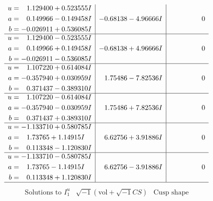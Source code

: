 \documentclass[1p]{elsarticle_modified}
\theoremstyle{definition}
\newcommand{\I}{\sqrt{-1}}
\begin{document}
$$\begin{array}{c|c|c}
\begin{aligned}
u &= \phantom{-}1.129400 + 0.523555 I \\
a &= \phantom{-}0.149966 - 0.149458 I \\
b &= -0.026911 + 0.536085 I\end{aligned}
 & -0.68138 - 4.96666 I & \phantom{-0.000000 } 0 \\ \hline\begin{aligned}
u &= \phantom{-}1.129400 - 0.523555 I \\
a &= \phantom{-}0.149966 + 0.149458 I \\
b &= -0.026911 - 0.536085 I\end{aligned}
 & -0.68138 + 4.96666 I & \phantom{-0.000000 } 0 \\ \hline\begin{aligned}
u &= \phantom{-}1.107220 + 0.614084 I \\
a &= -0.357940 + 0.030959 I \\
b &= \phantom{-}0.371437 - 0.389310 I\end{aligned}
 & \phantom{-}1.75486 - 7.82536 I & \phantom{-0.000000 } 0 \\ \hline\begin{aligned}
u &= \phantom{-}1.107220 - 0.614084 I \\
a &= -0.357940 - 0.030959 I \\
b &= \phantom{-}0.371437 + 0.389310 I\end{aligned}
 & \phantom{-}1.75486 + 7.82536 I & \phantom{-0.000000 } 0 \\ \hline\begin{aligned}
u &= -1.133710 + 0.580785 I \\
a &= \phantom{-}1.73765 + 1.14915 I \\
b &= \phantom{-}0.113348 - 1.120830 I\end{aligned}
 & \phantom{-}6.62756 + 3.91886 I & \phantom{-0.000000 } 0 \\ \hline\begin{aligned}
u &= -1.133710 - 0.580785 I \\
a &= \phantom{-}1.73765 - 1.14915 I \\
b &= \phantom{-}0.113348 + 1.120830 I\end{aligned}
 & \phantom{-}6.62756 - 3.91886 I & \phantom{-0.000000 } 0\\
 \hline 
 \end{array}$$\newpage$$\begin{array}{c|c|c}  
\text{Solutions to }I^u_{1}& \I (\text{vol} + \sqrt{-1}CS) & \text{Cusp shape}\\

\end{array}$$
\end{document}
